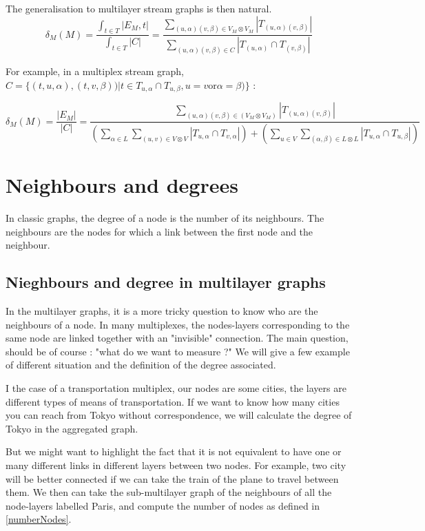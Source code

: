 \documentclass[dvipsnames,a4paper,11pt]{article}
\theoremstyle{definition}
\theoremstyle{remark}
\theoremstyle{remark}
\begin{document}
	The generalisation to multilayer stream graphs is then natural.
	\[
		\delta_M (M) = \frac{\int_{t\in T}|E_M,t|}{\int_{t\in T}|C|} = \frac{\sum_{(u,\alpha)(v,\beta) \in V_M \otimes V_M}|T_{(u,\alpha)(v,\beta)}|}{\sum_{(u,\alpha)(v,\beta) \in C}|T_{(u,\alpha)}\cap T_{(v,\beta)}|}
	\]

	For example, in a multiplex stream graph, $C=\{(t,u,\alpha),(t,v,\beta))| t\in T_{u,\alpha} \cap T_{u,\beta}, u=v \text{or} \alpha = \beta)\}$ :

	\[
		\delta_M (M) = 
		\frac{|E_M|}{|C|}= 
		\frac{\sum_{(u,\alpha)(v,\beta) \in (V_M \otimes V_M)} |T_{(u,\alpha)(v,\beta)}|}
		{(\sum_{\alpha \in L}\sum_{(u,v) \in V\otimes V}|T_{u,\alpha} \cap T_{v,\alpha}|)+( \sum_{u \in V } \sum_{(\alpha,\beta) \in L \otimes L}|T_{u,\alpha}\cap T_{u,\beta}|)}
	\]

		\section{Neighbours and degrees}
	
		In classic graphs, the degree of a node is the number of its neighbours. The neighbours are the nodes for which a link between the first node and the neighbour.
		
		\subsection{Nieghbours and degree in multilayer graphs}
		
		In the multilayer graphs, it is a more tricky question to know who are the neighbours of a node. In many multiplexes, the nodes-layers corresponding to the same node are linked together with an "invisible" connection. The main question, should be of course : "what do we want to measure ?" We will give a few example of different situation and the definition of the degree associated.
		
		I the case of a transportation multiplex, our nodes are some cities, the layers are different types of means of transportation. If we want to know how many cities you can reach from Tokyo without correspondence, we will calculate the degree of Tokyo in the aggregated graph.
		
		But we might want to highlight the fact that it is not equivalent to have one or many different links in different layers between two nodes. For example, two city will be better connected if we can take the train of the plane to travel between them.  We then can take the sub-multilayer graph of the neighbours of all the node-layers labelled Paris, and compute the number of nodes as defined in \ref{numberNodes}. 
		
\end{document}
